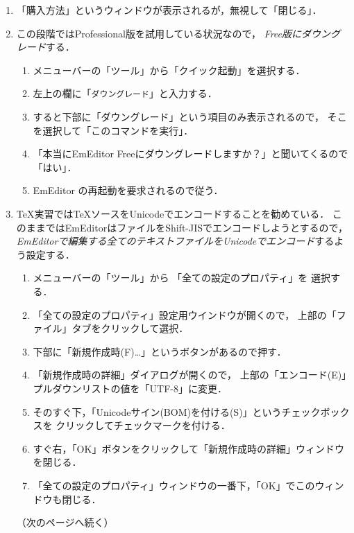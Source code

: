 \documentclass{ltjsarticle}
\begin{document}
\begin{enumerate}
\item 「購入方法」というウィンドウが表示されるが，無視して「閉じる」．
\item この段階ではProfessional版を試用している状況なので，
  \emph{Free版にダウングレード}する．

  \begin{enumerate}
  \item %
    メニューバーの「ツール」から「クイック起動」を選択する．
  \item 左上の欄に「\texttt{ダウングレード}」と入力する．
  \item すると下部に「ダウングレード」という項目のみ表示されるので，
    そこを選択して「このコマンドを実行」．
  \item 「本当にEmEditor Freeにダウングレードしますか？」と聞いてくるので「はい」．
  \item EmEditor の再起動を要求されるので従う．
  \end{enumerate}

\item TeX実習ではTeXソースをUnicodeでエンコードすることを勧めている．
  このままではEmEditorはファイルをShift-JISでエンコードしようとするので，
  \emph{EmEditorで編集する全てのテキストファイルをUnicodeでエンコード}するよう設定する．
  \begin{enumerate}
  \item メニューバーの「ツール」から
    「全ての設定のプロパティ」を%
    選択する．
  \item 「全ての設定のプロパティ」設定用ウインドウが開くので，
    上部の「ファイル」タブをクリックして選択．
  \item 下部に「新規作成時(F)…」というボタンがあるので押す．
  \item 「新規作成時の詳細」ダイアログが開くので，
    上部の「エンコード(E)」プルダウンリストの値を「UTF-8」に変更．
  \item そのすぐ下，「Unicodeサイン(BOM)を付ける(S)」というチェックボックスを
    クリックしてチェックマークを付ける．
  \item すぐ右，「OK」ボタンをクリックして「新規作成時の詳細」ウィンドウを閉じる．
  \item 「全ての設定のプロパティ」ウィンドウの一番下，「OK」でこのウィンドウも閉じる．
  \end{enumerate}
  （次のページへ続く）
  \newpage
  

\end{enumerate}
\end{document}
